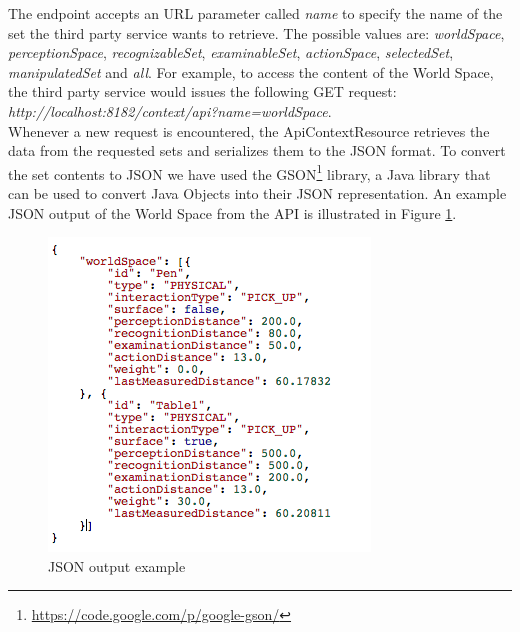 The endpoint accepts an URL parameter called \emph{name} to specify the name of the set the third party service wants to retrieve. The possible values are: \emph{worldSpace}, \emph{perceptionSpace}, \emph{recognizableSet}, \emph{examinableSet}, \emph{actionSpace}, \emph{selectedSet}, \emph{manipulatedSet} and \emph{all}. For example, to access the content of the World Space, the third party service would issues the following GET request: \emph{http://localhost:8182/context/api?name=worldSpace}.\\

Whenever a new request is encountered, the ApiContextResource retrieves the data from the requested sets and serializes them to the JSON format. To convert the set contents to JSON we have used the GSON\footnote{\url{https://code.google.com/p/google-gson/}} library, a Java library that can be used to convert Java Objects into their JSON representation. An example JSON output of the World Space from the API is illustrated in Figure \ref{fig:impl_json_example}.
\begin{figure}[H]
	\centering
	\includegraphics[width=\linewidth]{gfx/Chapter4/json_example}
	\caption{JSON output example}
	\label{fig:impl_json_example}
\end{figure}
